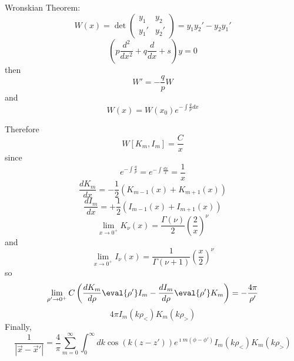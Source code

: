 \documentclass[a4paper,twoside,master.tex]{subfiles}
\begin{document}
\begin{theorem}
    Wronskian Theorem:
    \begin{equation}
        W(x) = \det \begin{pmatrix} y_1&y_2 \\ y_1' & y_2' \end{pmatrix} = y_1y_2' - y_2 y_1'
    \end{equation}
    \begin{equation}
        \left( p \frac{d^2}{dx^2} + q \frac{d}{dx} + s \right)y = 0
    \end{equation}
    then
    \begin{equation}
        W' = -\frac{q}{p}W
    \end{equation}
    and
    \begin{equation}
        W(x) = W(x_0) e^{-\int \frac{q}{p}dx}
    \end{equation}
\end{theorem}

Therefore
\begin{equation}
    W[K_m,I_m] = \frac{C}{x}
\end{equation}
since
\begin{equation}
    e^{-\int \frac{q}{p}} = e^{-\int \frac{dx}{x}} = \frac{1}{x}
\end{equation}
\begin{equation}
    \frac{dK_m}{dx} = -\frac{1}{2}(K_{m-1}(x) + K_{m+1}(x))
\end{equation}
\begin{equation}
    \frac{dI_m}{dx} = +\frac{1}{2}(I_{m-1}(x) + I_{m+1}(x))
\end{equation}
\begin{equation}
    \lim_{x\to 0^+} K_\nu(x) = \frac{\Gamma(\nu)}{2}\left( \frac{2}{x} \right)^\nu
\end{equation}
and
\begin{equation}
\lim_{x\to 0^+} I_\nu(x) = \frac{1}{\Gamma(\nu+1)}\left( \frac{x}{2} \right)^\nu
\end{equation}
so
\begin{equation}
    \lim_{\rho'\to 0^+} C\left( \frac{dK_m}{d\rho}\eval{\rho'} I_m - \frac{dI_m}{d\rho}\eval{\rho'} K_m \right) = -\frac{4\pi}{\rho'}
\end{equation}
\begin{equation}
    4\pi I_m(k\rho_<) K_m(k\rho_>)
\end{equation}
Finally,
\begin{equation}
    \frac{1}{|\vec{x}-\vec{x}'|} = \frac{4}{\pi}\sum_{m=0}^{\infty}\int_0^\infty dk \cos(k(z-z')) e^{\imath m(\phi-\phi')} I_m(k\rho_<)K_m(k\rho_>)
\end{equation}
\end{document}
